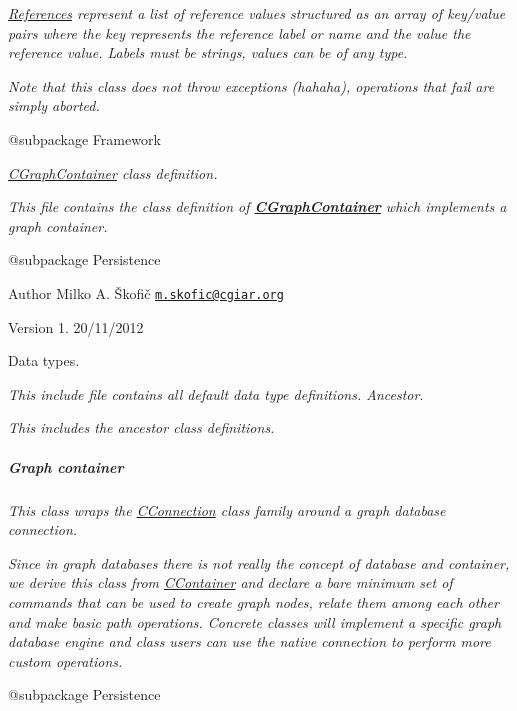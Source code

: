 {\itshape \hyperlink{}{References} represent a list of reference values structured as an array of key/value pairs where the key represents the reference label or name and the value the reference value. Labels must be strings, values can be of any type.}

{\itshape Note that this class does not throw exceptions (hahaha), operations that fail are simply aborted.}

{\itshape \begin{DoxyVerb} @subpackage        Framework\end{DoxyVerb}
}

{\itshape {\itshape \hyperlink{class_c_graph_container}{C\-Graph\-Container}} class definition.}

{\itshape This file contains the class definition of {\bfseries \hyperlink{class_c_graph_container}{C\-Graph\-Container}} which implements a graph container.}

{\itshape \begin{DoxyVerb} @subpackage        Persistence
\end{DoxyVerb}
}

{\itshape \begin{DoxyAuthor}{Author}
Milko A. Škofič \href{mailto:m.skofic@cgiar.org}{\tt m.\-skofic@cgiar.\-org} 
\end{DoxyAuthor}
\begin{DoxyVersion}{Version}
1. 20/11/2012
\end{DoxyVersion}
Data types.}

{\itshape This include file contains all default data type definitions. Ancestor.}

{\itshape This includes the ancestor class definitions. \subparagraph*{Graph container}}

{\itshape }

{\itshape This class wraps the \hyperlink{class_c_connection}{C\-Connection} class family around a graph database connection.}

{\itshape Since in graph databases there is not really the concept of database and container, we derive this class from \hyperlink{class_c_container}{C\-Container} and declare a bare minimum set of commands that can be used to create graph nodes, relate them among each other and make basic path operations. Concrete classes will implement a specific graph database engine and class users can use the native connection to perform more custom operations.}

{\itshape \begin{DoxyVerb} @subpackage        Persistence\end{DoxyVerb}
}

